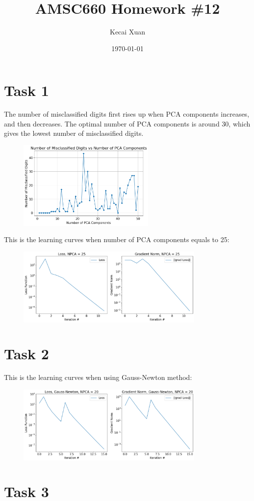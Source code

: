 \documentclass[12pt]{article}
\begin{document}
\setlength{\parindent}{0pt}

\title{AMSC660 Homework \#12}
\author{Kecai Xuan}
\date{\today}
\maketitle

\section*{Task 1}

The number of misclassified digits first rises up when PCA components increases, and then decreases. The optimal number of PCA components is around 30, which gives the lowest number of misclassified digits.

\begin{figure}[ht]
    \centering
    \includegraphics[width=0.6\textwidth]{./imgs/component.png}
\end{figure}

This is the learning curves when number of PCA components equals to 25:
\begin{figure}[ht]
    \centering
    \includegraphics[width=0.82\textwidth]{./imgs/loss.png}
\end{figure}


\section*{Task 2}

This is the learning curves when using Gauss-Newton method:
\begin{figure}[ht]
    \centering
    \includegraphics[width=0.82\textwidth]{./imgs/gauss_newton.png}
\end{figure}


\section*{Task 3}
\end{document}
